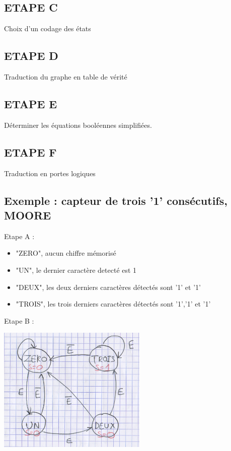 \subsection{ETAPE C}
Choix d'un codage des états

\subsection{ETAPE D}
Traduction du graphe en table de vérité

\subsection{ETAPE E}
Déterminer les équations booléennes simplifiées.

\subsection{ETAPE F}
Traduction en portes logiques

\subsection{Exemple : capteur de trois '1' consécutifs, MOORE}

Etape A :
\begin{itemize}
  \item "ZERO", aucun chiffre mémorisé
  \item "UN", le dernier caractère detecté est 1
  \item "DEUX", les deux derniers caractères détectés sont '1' et '1'
  \item "TROIS", les trois derniers caractères détectés sont '1','1' et '1'
\end{itemize}

Etape B :\\
\begin{center}
  \includegraphics[height=6cm]{cours1/pics/graph2.png}
\end{center}

